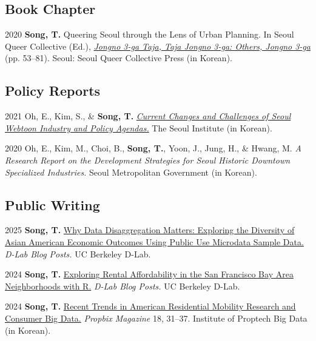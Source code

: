 \documentclass[11pt,letterpaper]{article}
\begin{document}
\subsection{Book Chapter}
\begin{tablist}
  \item[2020] \tab{}\textbf{Song, T.} Queering Seoul through the Lens of Urban Planning. In Seoul Queer Collective (Ed.), \emph{\href{http://www.kyobobook.co.kr/product/detailViewKor.laf?ejkGb=KOR&mallGb=KOR&barcode=9791197096501}{Jongno 3-ga Taja, Taja Jongno 3-ga: Others, Jongno 3-ga}} (pp. 53–81). Seoul: Seoul Queer Collective Press (in Korean).
\end{tablist}

\subsection{Policy Reports}
\begin{tablist}
  \item[2021] \tab{}Oh, E., Kim, S., \& \textbf{Song, T.} \emph{\href{https://www.si.re.kr/bbs/view.do?key=2024100039&pstSn=2111190001}{Current Changes and Challenges of Seoul Webtoon Industry and Policy Agendas.}} The Seoul Institute (in Korean).
  \item[2020] \tab{}Oh, E., Kim, M., Choi, B., \textbf{Song, T.}, Yoon, J., Jung, H., \& Hwang, M. \emph{A Research Report on the Development Strategies for Seoul Historic Downtown Specialized Industries.} Seoul Metropolitan Government (in Korean).
\end{tablist}

\subsection{Public Writing}
\begin{tablist}
  \item[2025] \tab{}\textbf{Song, T.} \href{https://medium.com/@dlab-berkeley/why-data-disaggregation-matters-exploring-the-diversity-of-asian-american-economic-outcomes-using-8b96e5dcc9a4}{Why Data Disaggregation Matters: Exploring the Diversity of Asian American Economic Outcomes Using Public Use Microdata Sample Data.} \emph{D-Lab Blog Posts.} UC Berkeley D-Lab.
  \item[2024] \tab{}\textbf{Song, T.} \href{https://medium.com/@dlab-berkeley/exploring-rental-affordability-in-the-san-francisco-bay-area-neighborhoods-with-r-c4383f7553e7}{Exploring Rental Affordability in the San Francisco Bay Area Neighborhoods with R.} \emph{D-Lab Blog Posts.} UC Berkeley D-Lab.
  \item[2024] \tab{}\textbf{Song, T.} \href{https://www.kahps.org/data/prbx/pdf_44_7}{Recent Trends in American Residential Mobility Research and Consumer Big Data.} \emph{Propbix Magazine} 18, 31–37. Institute of Proptech Big Data (in Korean).
\end{tablist}
\end{document}
